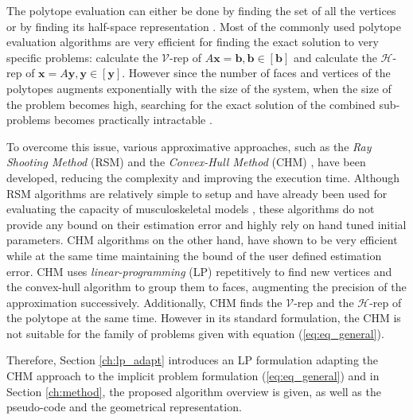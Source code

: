 The polytope evaluation can either be done by finding the set of all the vertices  or by finding its half-space representation . Most of the commonly used polytope evaluation algorithms are very efficient for finding the exact solution to very specific problems: \cite{fukuda_dd}\cite{skuric:hal-02993408}\cite{sasaki2011vertex} calculate the $\mathcal{V}$-rep of $A\bm{x}\!=\!\bm{b},\bm{b}\!\in\![\bm{b}]$ and \cite{hyper_psm}\cite{dantzig1973fourier}\cite{jones2004equality} calculate the $\mathcal{H}$-rep of $\bm{x}\!=\! A\bm{y},\bm{y}\!\in\![\bm{y}]$. However since the number of faces and vertices of the polytopes augments exponentially with the size of the system, when the size of the problem becomes high, searching for the exact solution of the combined sub-problems becomes practically intractable \cite{Huynh2005PracticalIO}. 

To overcome this issue, various approximative approaches, such as the  \textit{Ray Shooting Method} (RSM)  \cite{agarwal1993ray} and the \textit{Convex-Hull Method} (CHM) \cite{lassez1992quantifier}, have been developed, reducing the complexity and improving the execution time. 
Although RSM algorithms are relatively simple to setup and have already been used for evaluating the capacity of musculoskeletal models \cite{carmichael2011Towards}, these algorithms do not provide any bound on their estimation error and highly rely on hand tuned initial parameters. 
CHM \cite{lassez1992quantifier} algorithms on the other hand, have shown to be very efficient while at the same time maintaining the bound of the user defined estimation error. CHM uses  \textit{linear-programming} (LP) repetitively to find new vertices and the convex-hull algorithm to group them to faces, augmenting the precision of the approximation successively. Additionally, CHM finds the $\mathcal{V}$-rep and the $\mathcal{H}$-rep of the polytope at the same time.  However in its standard formulation, the CHM is not suitable for the family of problems given with equation (\ref{eq:eq_general}). 

Therefore, Section \ref{ch:lp_adapt} introduces an LP formulation adapting the CHM approach to the implicit problem formulation (\ref{eq:eq_general}) and in Section \ref{ch:method}, the proposed algorithm overview is given, as well as the pseudo-code and the geometrical representation.


